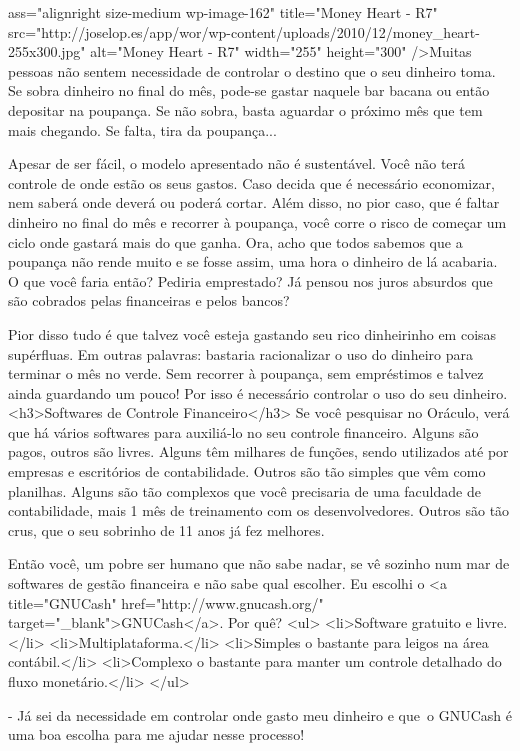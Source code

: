 ass="alignright size-medium wp-image-162" title="Money Heart - R7" src="http://joselop.es/app/wor/wp-content/uploads/2010/12/money_heart-255x300.jpg" alt="Money Heart - R7" width="255" height="300" />Muitas pessoas não sentem necessidade de controlar o destino que o seu dinheiro toma. Se sobra dinheiro no final do mês, pode-se gastar naquele bar bacana ou então depositar na poupança. Se não sobra, basta aguardar o próximo mês que tem mais chegando. Se falta, tira da poupança...

Apesar de ser fácil, o modelo apresentado não é sustentável. Você não terá controle de onde estão os seus gastos. Caso decida que é necessário economizar, nem saberá onde deverá ou poderá cortar. Além disso, no pior caso, que é faltar dinheiro no final do mês e recorrer à poupança, você corre o risco de começar um ciclo onde gastará mais do que ganha. Ora, acho que todos sabemos que a poupança não rende muito e se fosse assim, uma hora o dinheiro de lá acabaria. O que você faria então? Pediria emprestado? Já pensou nos juros absurdos que são cobrados pelas financeiras e pelos bancos?

Pior disso tudo é que talvez você esteja gastando seu rico dinheirinho em coisas supérfluas. Em outras palavras: bastaria racionalizar o uso do dinheiro para terminar o mês no verde. Sem recorrer à poupança, sem empréstimos e talvez ainda guardando um pouco! Por isso é necessário controlar o uso do seu dinheiro.
<h3>Softwares de Controle Financeiro</h3>
Se você pesquisar no Oráculo, verá que há vários softwares para auxiliá-lo no seu controle financeiro. Alguns são pagos, outros são livres. Alguns têm milhares de funções, sendo utilizados até por empresas e escritórios de contabilidade. Outros são tão simples que vêm como planilhas. Alguns são tão complexos que você precisaria de uma faculdade de contabilidade, mais 1 mês de treinamento com os desenvolvedores. Outros são tão crus, que o seu sobrinho de 11 anos já fez melhores.

Então você, um pobre ser humano que não sabe nadar, se vê sozinho num mar de softwares de gestão financeira e não sabe qual escolher. Eu escolhi o <a title="GNUCash" href="http://www.gnucash.org/" target="_blank">GNUCash</a>. Por quê?
<ul>
    <li>Software gratuito e livre.</li>
    <li>Multiplataforma.</li>
    <li>Simples o bastante para leigos na área contábil.</li>
    <li>Complexo o bastante para manter um controle detalhado do fluxo monetário.</li>
</ul>

- Já sei da necessidade em controlar onde gasto meu dinheiro e que o GNUCash é uma boa escolha para me ajudar nesse processo!

